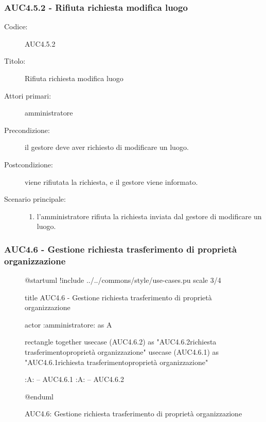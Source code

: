\documentclass[casi-duso]{subfiles}
\begin{document}
\subsubsection{AUC4.5.2 - Rifiuta richiesta modifica luogo}%
\label{subsub:AUC4.5.2}
\begin{description}
  \item[Codice:] AUC4.5.2
  \item[Titolo:] Rifiuta richiesta modifica luogo
  \item[Attori primari:] amministratore
  \item[Precondizione:] il gestore deve aver richiesto di modificare un luogo.
  \item[Postcondizione:] viene rifiutata la richiesta, e il gestore viene informato.
  \item[Scenario principale:]
  \begin{enumerate}
    \item l'amministratore rifiuta la richiesta inviata dal gestore di modificare un luogo.
  \end{enumerate}
\end{description}

\subsubsection{AUC4.6 - Gestione richiesta trasferimento di proprietà organizzazione}%
\label{subsub:AUC4.6}

\begin{figure}[h!] 
  \centering 
  \begin{plantuml}
  @startuml
  !include ../../commons/style/use-cases.pu
  scale 3/4

  title AUC4.6 - Gestione richiesta trasferimento di proprietà organizzazione

  actor :amministratore: as A

  rectangle {
    together {
      usecase (AUC4.6.2) as "AUC4.6.2\nRifiuta richiesta trasferimento\ndi proprietà organizzazione"
      usecase (AUC4.6.1) as "AUC4.6.1\nAccetta richiesta trasferimento\ndi proprietà organizzazione"
    }
  }

  :A: -- AUC4.6.1
  :A: -- AUC4.6.2

  @enduml
  \end{plantuml} 
  \caption{AUC4.6: Gestione richiesta trasferimento di proprietà organizzazione}
  \label{fig:auc4_6} 
\end{figure}
\end{document}
